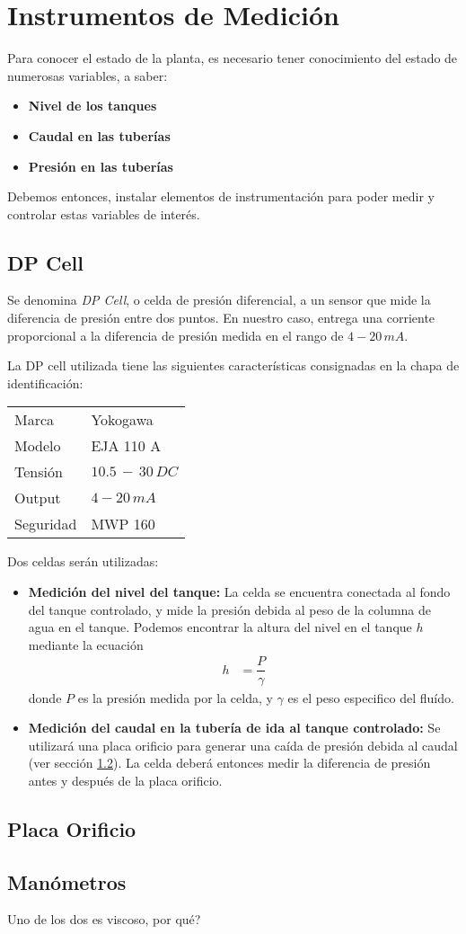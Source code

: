\section{Instrumentos de Medición}
\label{sec:InstrumentosMedicion}
Para conocer el estado de la planta, es necesario tener conocimiento del
estado de numerosas variables, a saber:
\begin{itemize}
 \item \textbf{Nivel de los tanques}
 \item \textbf{Caudal en las tuberías}
 \item \textbf{Presión en las tuberías}
\end{itemize}
Debemos entonces, instalar elementos de instrumentación para poder 
medir y controlar estas variables de interés.

\subsection{DP Cell}
\label{subsec:DPCell}
Se denomina \textit{DP Cell}, o celda de presión diferencial, a un sensor
que mide la diferencia de presión entre dos puntos.
En nuestro caso, entrega una corriente proporcional a la diferencia de presión 
medida en el rango de $4-20\,mA$.

La DP cell utilizada tiene las siguientes características consignadas en 
la chapa de identificación:

\begin{center}
\begin{tabular}{|l|l|}
\hline
Marca & Yokogawa\\
Modelo & EJA 110 A\\
Tensión & $10.5\,-\,30 \, DC$\\
Output & $4-20\,mA$\\
Seguridad & MWP 160\\
\hline
\end{tabular}
\end{center}

Dos celdas serán utilizadas:
\begin{itemize}
 \item \textbf{Medición del nivel del tanque:} La celda se encuentra conectada
 al fondo del tanque controlado, y mide la presión debida al peso
 de la columna de agua en el tanque. 
 Podemos encontrar la altura del nivel en el tanque $h$ mediante la ecuación
 \begin{align}
  h &= \dfrac{P}{\gamma}
 \end{align}
donde $P$ es la presión medida por la celda, y $\gamma$ es el peso especifico
del fluído.
\item \textbf{Medición del caudal en la tubería de ida al tanque controlado:}
Se utilizará una placa orificio para generar una caída de presión debida al 
caudal (ver sección \ref{subsec:PlacaOrificio}). 
La celda deberá entonces medir la diferencia de presión antes y después
de la placa orificio.
\end{itemize}


\subsection{Placa Orificio}
\label{subsec:PlacaOrificio}

\subsection{Manómetros}
\label{subsec:Manometros}
Uno de los dos es viscoso, por qué? 
